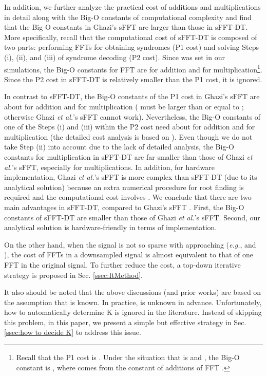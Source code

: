 \documentclass[journal,onecolumn,11pt]{IEEEtran}
\begin{document}
In addition, we further analyze the practical cost of additions and multiplications in detail along with the Big-O constants of computational complexity and find that the Big-O constants in Ghazi's sFFT are larger than those in sFFT-DT.
More specifically, recall that the computational cost of sFFT-DT is composed of two parts:
performing FFTs for obtaining syndromes (P1 cost) and solving Steps (i), (ii), and (iii) of syndrome decoding (P2 cost).
Since  was set in our simulations, the Big-O constants for FFT are  for addition and  for multiplication\footnote{Recall that the P1 cost is . Under the situation that  is  and , the Big-O constant is , where  comes from the constant of additions of FFT \cite{Saidi1994}.}.
Since the P2 cost in sFFT-DT is relatively smaller than the P1 cost, it is ignored.

In contrast to sFFT-DT, the Big-O constants of the P1 cost in Ghazi's sFFT \cite{Ghazi2013} are about  for addition and  for multiplication ( must be larger than or equal to ; otherwise Ghazi {\em et al.}'s sFFT cannot work).
Nevertheless, the Big-O constants of one of the Steps (i) and (iii) within the P2 cost need about  for addition and  for multiplication (the detailed cost analysis is based on \cite{NChen2008}). Even though we do not take Step (ii) into account due to the lack of detailed analysis, the Big-O constants for multiplication in sFFT-DT are far smaller than those of Ghazi {\em et al.}'s sFFT, especially for multiplications.
In addition, for hardware implementation, Ghazi {\em et al.}'s sFFT is more complex than sFFT-DT (due to its analytical solution) because an extra numerical procedure for root finding is required and the computational cost involves .
We conclude that there are two main advantages in sFFT-DT, compared to Ghazi's sFFT \cite{Ghazi2013}.
First, the Big-O constants of sFFT-DT are smaller than those of Ghazi {\em et al.}'s sFFT.
Second, our analytical solution is hardware-friendly in terms of implementation.

On the other hand, when the signal is not so sparse with  approaching  ({\em e.g.},  and ), the cost of  FFTs in a downsampled signal is almost equivalent to that of one FFT in the original signal.
To further reduce the cost, a top-down iterative strategy is proposed in Sec. \ref{ssec:ItMethod}.

It also should be noted that the above discussions (and prior works) are based on the assumption that  is known.
In practice,  is unknown in advance.
Unfortunately, how to automatically determine K is ignored in the literature.
Instead of skipping this problem, in this paper, we present a simple but effective strategy in Sec. \ref{ssec:how to decide K} to address this issue.
\end{document}

